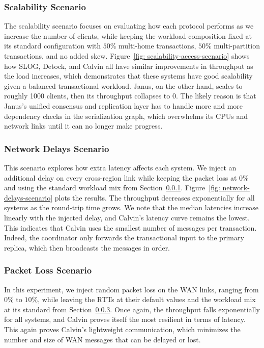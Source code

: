\subsubsection{Scalability Scenario}
\label{subsubsec: scalability-scenario}
The scalability scenario focuses on evaluating how each protocol performs as we increase the number of clients, while keeping the workload composition fixed at its standard configuration with $50\%$ multi-home transactions, $50\%$ multi-partition transactions, and no added skew. Figure~\ref{fig: scalability-access-scenario} shows how SLOG, Detock, and Calvin all have similar improvements in throughput as the load increases, which demonstrates that these systems have good scalability given a balanced transactional workload. Janus, on the other hand, scales to roughly 1000 clients, then its throughput collapses to 0. The likely reason is that Janus's unified consensus and replication layer has to handle more and more dependency checks in the serialization graph, which overwhelms its CPUs and network links until it can no longer make progress.

\subsubsection{Network Delays Scenario}
\label{subsubsec: network-delays-scenario}
This scenario explores how extra latency affects each system. We inject an additional delay on every cross-region link while keeping the packet loss at $0\%$ and using the standard workload mix from Section~\ref{subsubsec: scalability-scenario}. Figure~\ref{fig: network-delays-scenario} plots the results. The throughput decreases exponentially for all systems as the round-trip time grows. We note that the median latencies increase linearly with the injected delay, and Calvin's latency curve remains the lowest. This indicates that Calvin uses the smallest number of messages per transaction. Indeed, the coordinator only forwards the transactional input to the primary replica, which then broadcasts the messages in order. 

\subsubsection{Packet Loss Scenario}
\label{subsubsec: packet-loss-scenario}
In this experiment, we inject random packet loss on the WAN links, ranging from $0\%$ to $10\%$, while leaving the RTTs at their default values and the workload mix at its standard from Section~\ref{subsubsec: packet-loss-scenario}. Once again, the throughput falls exponentially for all systems, and Calvin proves itself the most resilient in terms of latency. This again proves Calvin's lightweight communication, which minimizes the number and size of WAN messages that can be delayed or lost.